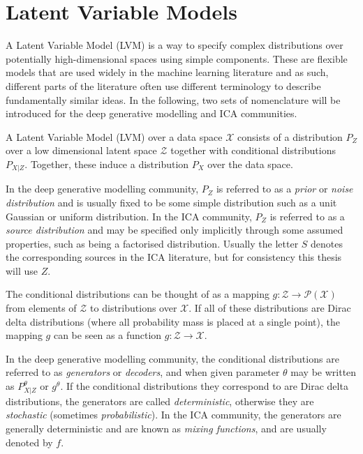 \section{Latent Variable Models}\label{sec:literature-lvms}

A Latent Variable Model (LVM) is a way to specify complex distributions over potentially high-dimensional spaces using simple components. 
These are flexible models that are used widely in the machine learning literature and as such, different parts of the literature often use different terminology to describe fundamentally similar ideas.
In the following, two sets of nomenclature will be introduced for the deep generative modelling and ICA communities.

\medskip

\begin{definition}
A Latent Variable Model (LVM) over a data space $\mathcal{X}$ consists of a distribution $P_Z$ over a low dimensional latent space $\mathcal{Z}$ together with conditional distributions $P_{X|Z}$. 
Together, these induce a distribution $P_X$ over the data space. 
\end{definition}



In the deep generative modelling community, $P_Z$ is referred to as a \emph{prior} or \emph{noise distribution} and is usually fixed to be some simple distribution such as a unit Gaussian or uniform distribution. 
In the ICA community, $P_Z$ is referred to as a \emph{source distribution} and may be specified only implicitly through some assumed properties, such as being a factorised distribution.
Usually the letter $S$ denotes the corresponding sources in the ICA literature, but for consistency this thesis will use $Z$.

The conditional distributions can be thought of as a mapping $g:\mathcal{Z}\to\mathcal{P}(\mathcal{X})$ from elements of $\mathcal{Z}$ to distributions over $\mathcal{X}$.
If all of these distributions are Dirac delta distributions (where all probability mass is placed at a single point), the mapping $g$ can be seen as a function $g:\mathcal{Z}\to\mathcal{X}$. 

In the deep generative modelling community, the conditional distributions are referred to as \emph{generators} or \emph{decoders}, and when given parameter $\theta$ may be written as $P_{X|Z}^\theta$ or $g^\theta$. 
If the conditional distributions they correspond to are Dirac delta distributions, the generators are called \emph{deterministic}, otherwise they are \emph{stochastic} (sometimes \emph{probabilistic}).
In the ICA community, the generators are generally deterministic and are known as \emph{mixing functions}, and are usually denoted by $f$.

